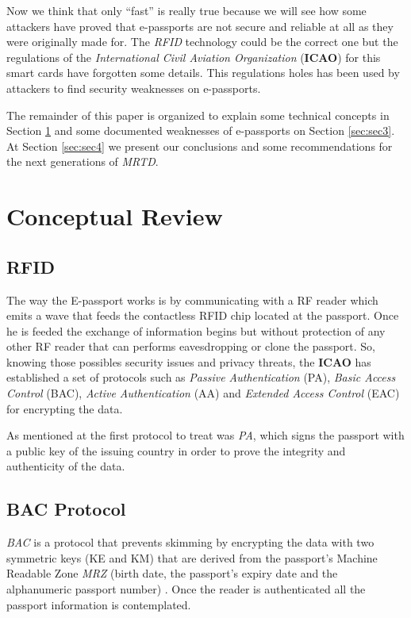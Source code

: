 \documentclass{acm_proc_article-sp}
\begin{document}
Now we think that only “fast” is really true because we will see how some attackers have proved that e-passports are not secure and reliable at all as they were originally made for. The \emph{RFID} technology could be the correct one but the regulations of the \emph{International Civil Aviation Organization }(\textbf{ICAO}) for this smart cards have forgotten some details. This regulations holes has been used by attackers to find security weaknesses on e-passports.

The remainder of this paper is organized to explain some technical concepts in Section \ref{sec:sec2} and some documented weaknesses of e-passports on Section \ref{sec:sec3}. At Section \ref{sec:sec4} we present our conclusions and some recommendations for the next generations of \emph{MRTD}. 

\section{Conceptual Review}
\label{sec:sec2}

\subsection{RFID}
The way the E-passport works is by communicating with a RF reader which emits a wave that feeds 
the contactless RFID chip located at the passport. Once he is feeded the exchange of information begins but 
without protection of any other RF reader that can performs eavesdropping or clone the passport. So, knowing those possibles security issues and privacy threats, the \textbf{ICAO} 
has 
established a set of protocols such as \textit{Passive Authentication} (PA), \textit{Basic Access Control} (BAC), 
\textit{Active Authentication} (AA) and \textit{Extended Access Control} (EAC) for encrypting the data.

As mentioned at \cite{NM12} the first protocol to treat was \textit{PA}, which signs the passport with 
a public key of the issuing country in order to prove the integrity and authenticity of the data.

\subsection{BAC Protocol}
\textit{BAC} is a protocol that prevents skimming by encrypting 
the data with two symmetric keys (KE and KM) that are derived from the passport's  
Machine Readable Zone \textit{MRZ} (birth date, the passport’s expiry date and the alphanumeric 
passport number) \cite{CLPS07}. Once the reader is authenticated all the passport information is contemplated.
\end{document}
